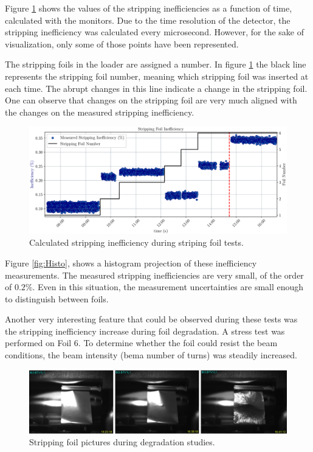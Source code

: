 Figure \ref{fig:StrippingIneff} shows the values of the stripping inefficiencies as a function of time, calculated with the \hzhm monitors. Due to the time resolution of the detector, the stripping inefficiency was calculated every microsecond. However, for the sake of visualization, only some of those points have been represented. 

The stripping foils in the loader are assigned a number. In figure \ref{fig:StrippingIneff} the black line represents the stripping foil number, meaning which stripping foil was inserted at each time. The abrupt changes in this line indicate a change in the stripping foil. One can observe that changes on the stripping foil are very much aligned with the changes on the measured stripping inefficiency. 

\begin{figure}[h]
    \centering
    \includegraphics[width=1.0\columnwidth]{StrippingEfficiency13April/April16.pdf}
    \caption{Calculated stripping inefficiency during striping foil tests.}
    \label{fig:StrippingIneff}
\end{figure}

Figure \ref{fig:Histo}, shows a histogram projection of these inefficiency measurements.  The measured stripping inefficiencies are very small, of the order of $0.2 \%$. Even in this situation, the measurement uncertainties are small enough to distinguish between foils. 

Another very interesting feature that could be observed during these tests was the stripping inefficiency increase during foil degradation. A stress test was performed on Foil 6. To determine whether the foil could resist the beam conditions, the beam intensity (bema number of turns) was steadily increased. 

\begin{figure}[h]
    \centering
    \includegraphics[width=1.0\columnwidth]{Figure_SFPicture/SFDegradationPicture.png}
    \caption{Stripping foil pictures during degradation studies.}
    \label{fig:FoilPicture}
\end{figure}

